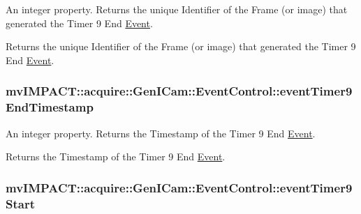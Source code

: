 An integer property. Returns the unique Identifier of the Frame (or image) that generated the Timer 9 End \hyperlink{classmv_i_m_p_a_c_t_1_1acquire_1_1_event}{Event}. 

Returns the unique Identifier of the Frame (or image) that generated the Timer 9 End \hyperlink{classmv_i_m_p_a_c_t_1_1acquire_1_1_event}{Event}. \hypertarget{classmv_i_m_p_a_c_t_1_1acquire_1_1_gen_i_cam_1_1_event_control_a60385b4f85d500c5b228f25f7288a183}{
\subsubsection[{event\+Timer9\+End\+Timestamp}]{ mv\+I\+M\+P\+A\+C\+T\+::acquire\+::\+Gen\+I\+Cam\+::\+Event\+Control\+::event\+Timer9\+End\+Timestamp}}\label{classmv_i_m_p_a_c_t_1_1acquire_1_1_gen_i_cam_1_1_event_control_a60385b4f85d500c5b228f25f7288a183}


An integer property. Returns the Timestamp of the Timer 9 End \hyperlink{classmv_i_m_p_a_c_t_1_1acquire_1_1_event}{Event}. 

Returns the Timestamp of the Timer 9 End \hyperlink{classmv_i_m_p_a_c_t_1_1acquire_1_1_event}{Event}. \hypertarget{classmv_i_m_p_a_c_t_1_1acquire_1_1_gen_i_cam_1_1_event_control_acfbcbd7beeea1fa304313ec99c6e5aa0}{
\subsubsection[{event\+Timer9\+Start}]{ mv\+I\+M\+P\+A\+C\+T\+::acquire\+::\+Gen\+I\+Cam\+::\+Event\+Control\+::event\+Timer9\+Start}}\label{classmv_i_m_p_a_c_t_1_1acquire_1_1_gen_i_cam_1_1_event_control_acfbcbd7beeea1fa304313ec99c6e5aa0}


